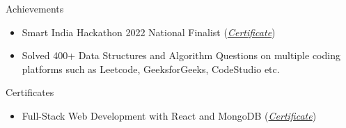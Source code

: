 \documentclass{resume} %
\begin{document}

\begin{rSection}{Achievements}
\begin{itemize}
   \item {Smart India Hackathon 2022 National Finalist} {\normalfont (\href{https://drive.google.com/file/d/1No-u1sUaclG-nf7_Gtym5JDEz1ydyRSL/view?usp=sharing}{\emph{Certificate}})}
    \item { {\normalfont Solved} 400+ {\normalfont Data Structures and Algorithm Questions on} multiple coding platforms such as Leetcode, GeeksforGeeks, CodeStudio {\normalfont etc.} }
\end{itemize}
\end{rSection}



\begin{rSection}{Certificates}
\begin{itemize}
   \item {Full-Stack Web Development with React and MongoDB} {\normalfont (\href{https://www.udemy.com/certificate/UC-156daafe-cfd7-4b60-82be-4d995f308dbc/}{\emph{Certificate}})}
   \\
\end{itemize}

\end{rSection}



\end{document}
